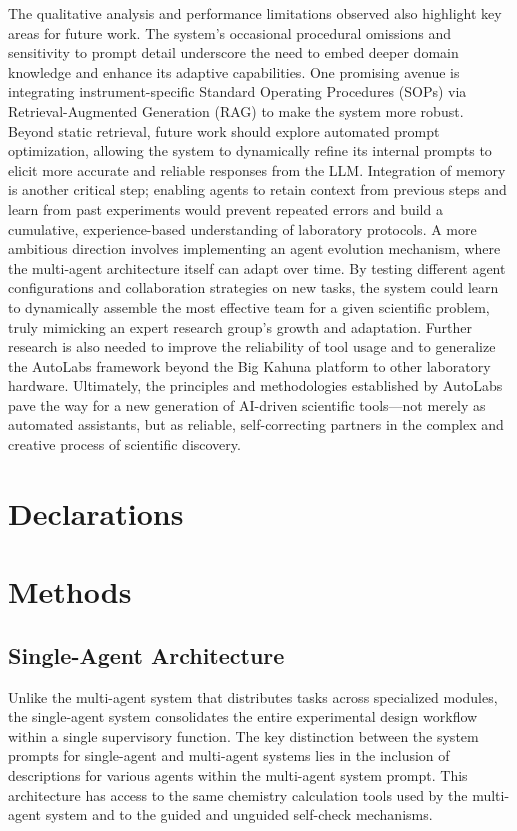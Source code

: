 \documentclass[sn-nature, twocolumn]{sn-jnl}%
\theoremstyle{thmstyleone}%
\theoremstyle{thmstyletwo}%
\theoremstyle{thmstylethree}%
\begin{document}
The qualitative analysis and performance limitations observed also highlight key areas for future work. The system's occasional procedural omissions and sensitivity to prompt detail underscore the need to embed deeper domain knowledge and enhance its adaptive capabilities. One promising avenue is integrating instrument-specific Standard Operating Procedures (SOPs) via Retrieval-Augmented Generation (RAG) to make the system more robust. Beyond static retrieval, future work should explore automated prompt optimization, allowing the system to dynamically refine its internal prompts to elicit more accurate and reliable responses from the LLM. Integration of memory is another critical step; enabling agents to retain context from previous steps and learn from past experiments would prevent repeated errors and build a cumulative, experience-based understanding of laboratory protocols. A more ambitious direction involves implementing an agent evolution mechanism, where the multi-agent architecture itself can adapt over time. By testing different agent configurations and collaboration strategies on new tasks, the system could learn to dynamically assemble the most effective team for a given scientific problem, truly mimicking an expert research group's growth and adaptation. Further research is also needed to improve the reliability of tool usage and to generalize the AutoLabs framework beyond the Big Kahuna platform to other laboratory hardware. Ultimately, the principles and methodologies established by AutoLabs pave the way for a new generation of AI-driven scientific tools—not merely as automated assistants, but as reliable, self-correcting partners in the complex and creative process of scientific discovery.



\section*{Declarations}

\section{Methods}

\subsection{Single-Agent Architecture}

Unlike the multi-agent system that distributes tasks across specialized modules, the single-agent system consolidates the entire experimental design workflow within a single supervisory function. The key distinction between the system prompts for single-agent and multi-agent systems lies in the inclusion of descriptions for various agents within the multi-agent system prompt. This architecture has access to the same chemistry calculation tools used by the multi-agent system  and to the guided and unguided self-check mechanisms.
\end{document}
